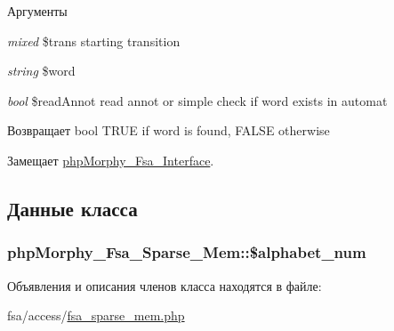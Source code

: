 \begin{DoxyParams}{Аргументы}
\item[{\em mixed}]\$trans starting transition \item[{\em string}]\$word \item[{\em bool}]\$readAnnot read annot or simple check if word exists in automat \end{DoxyParams}
\begin{DoxyReturn}{Возвращает}
bool TRUE if word is found, FALSE otherwise 
\end{DoxyReturn}


Замещает \hyperlink{interfacephpMorphy__Fsa__Interface_a6e249e8e54705e4c1d9399ff0e491ce0}{phpMorphy\_\-Fsa\_\-Interface}.



\subsection{Данные класса}
\hypertarget{classphpMorphy__Fsa__Sparse__Mem_a038b0a369cdd7ef841bf830f6740e3ea}{
\subsubsection[{\$alphabet\_\-num}]{\setlength{\rightskip}{0pt plus 5cm}phpMorphy\_\-Fsa\_\-Sparse\_\-Mem::\$alphabet\_\-num}}
\label{classphpMorphy__Fsa__Sparse__Mem_a038b0a369cdd7ef841bf830f6740e3ea}


Объявления и описания членов класса находятся в файле:\begin{DoxyCompactItemize}
\item 
fsa/access/\hyperlink{fsa__sparse__mem_8php}{fsa\_\-sparse\_\-mem.php}\end{DoxyCompactItemize}

